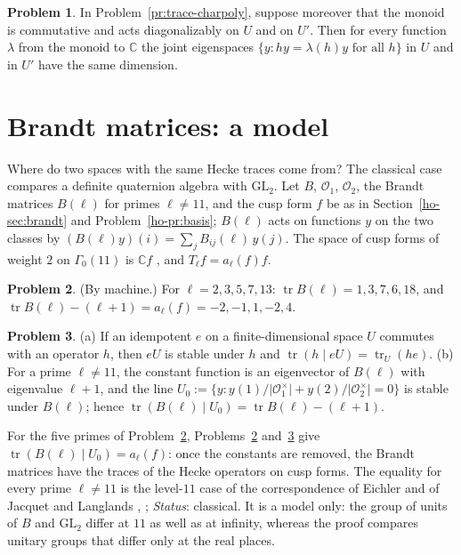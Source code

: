 \documentclass[reqno]{amsart}
\theoremstyle{plain}
\theoremstyle{definition}
\newtheorem{problem}{Problem}[section]
\newcommand{\C}{\mathbb{C}}
\newcommand{\Oc}{\mathcal{O}}
\newcommand{\tr}{\operatorname{tr}}
\begin{document}
\begin{problem}\label{pr:trace-mult}
In Problem~\ref{pr:trace-charpoly}, suppose moreover that the monoid is commutative and acts diagonalizably on \(U\) and on \(U'\).  Then for every function \(\lambda\) from the monoid to \(\C\) the joint eigenspaces \(\{y : hy = \lambda(h) y \text{ for all } h\}\) in \(U\) and in \(U'\) have the same dimension.
\end{problem}

\section{Brandt matrices: a model}\label{sec:brandt}

Where do two spaces with the same Hecke traces come from?  The classical case compares a definite quaternion algebra with \(\mathrm{GL}_2\).  Let \(B\), \(\Oc_1\), \(\Oc_2\), the Brandt matrices \(B(\ell)\) for primes \(\ell \ne 11\), and the cusp form \(f\) be as in Section~\ref{ho-sec:brandt} and Problem~\ref{ho-pr:basis}; \(B(\ell)\) acts on functions \(y\) on the two classes by \((B(\ell) y)(i) = \sum_j B_{ij}(\ell)\, y(j)\).  The space of cusp forms of weight \(2\) on \(\Gamma_0(11)\) is \(\C f\) \cite[\S3.9]{DS}, and \(T_\ell f = a_\ell(f) f\).

\begin{problem}\label{pr:level11}
(By machine.)  For \(\ell = 2, 3, 5, 7, 13\): \(\tr B(\ell) = 1, 3, 7, 6, 18\), and \(\tr B(\ell) - (\ell + 1) = a_\ell(f) = -2, -1, 1, -2, 4\).
\end{problem}

\begin{problem}\label{pr:remove-constants}
(a) If an idempotent \(e\) on a finite-dimensional space \(U\) commutes with an operator \(h\), then \(eU\) is stable under \(h\) and \(\tr(h \mid eU) = \tr_U(he)\).  (b) For a prime \(\ell \ne 11\), the constant function is an eigenvector of \(B(\ell)\) with eigenvalue \(\ell + 1\), and the line \(U_0 := \{y : y(1)/\lvert\Oc_1^\times\rvert + y(2)/\lvert\Oc_2^\times\rvert = 0\}\) is stable under \(B(\ell)\); hence \(\tr(B(\ell) \mid U_0) = \tr B(\ell) - (\ell + 1)\).
\end{problem}

For the five primes of Problem~\ref{pr:level11}, Problems~\ref{pr:level11} and~\ref{pr:remove-constants} give \(\tr(B(\ell) \mid U_0) = a_\ell(f)\): once the constants are removed, the Brandt matrices have the traces of the Hecke operators on cusp forms.  The equality for every prime \(\ell \ne 11\) is the level-\(11\) case of the correspondence of Eichler and of Jacquet and Langlands \cite{Ei73}, \cite[\S16]{JL}; \emph{Status}: classical.  It is a model only: the group of units of \(B\) and \(\mathrm{GL}_2\) differ at \(11\) as well as at infinity, whereas the proof compares unitary groups that differ only at the real places.
\end{document}

